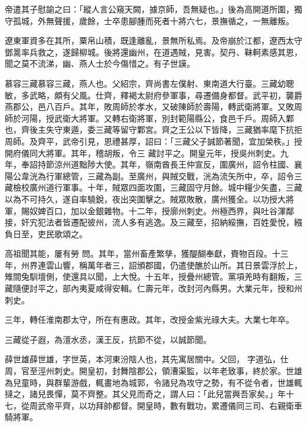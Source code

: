 \begin{pinyinscope}
 帝遣其子慰諭之曰：「縱人言公窺天闕，據京師，吾無疑也。」後為高開道所圍，獨守孤城，外無聲援，歲餘，士卒患腳腫而死者十將六七，景撫循之，一無離叛。



 遼東軍資多在其所，粟帛山積，既逢離亂，景無所私焉。及帝崩於江都，遼西太守鄧暠率兵救之，遂歸柳城。後將還幽州，在道遇賊，見害。契丹、靺軻素感其恩，聞之莫不流涕，幽、燕人士於今傷惜之。有子世謨。



 慕容三藏慕容三藏，燕人也。父紹宗，齊尚書左僕射、東南道大行臺。三藏幼聰敏，多武略，頗有父風。仕齊，釋褐太尉府參軍事，尋遷備身都督。武平初，襲爵燕郡公，邑八百戶。其年，敗周師於孝水，又破陳師於壽陽，轉武衛將軍。又敗周師於河陽，授武衛大將軍。又轉右衛將軍，別封範陽縣公，食邑千戶。周師入鄴也，齊後主失守東遁，委三藏等留守鄴宮。齊之王公以下皆降，三藏猶率麾下抗拒周師。及齊平，武帝引見，恩禮甚厚，詔曰：「三藏父子誠節著聞，宜加榮秩。」授開府儀同大將軍。其年，稽胡叛，令三
 藏討平之。開皇元年，授吳州刺史。九年，奉詔持節涼州道黜陟大使。其年，嶺南酋長王仲宣反，圍廣州，詔令柱國、襄陽公韋洸為行軍總管，三藏為副。至廣州，與賊交戰，洸為流矢所中，卒，詔令三藏檢校廣州道行軍事。十年，賊眾四面攻圍，三藏固守月餘。城中糧少矢盡，三藏以為不可持久，遂自率驍銳，夜出突圍擊之。賊眾敗散，廣州獲全。以功授大將軍，賜奴婢百口，加以金銀雜物。十二年，授廓州刺史。州極西界，與吐谷渾鄰接，奸宄犯法者皆遷配彼州，流人多有逃逸。及三藏至，招納綏撫，百姓愛悅，繦負日至，吏民歌頌之。



 高祖聞其能，屢有勞
 問。其年，當州畜產繁孳，獲醍醐奉獻，賚物百段。十三年，州界連雲山響，稱萬年者三，詔頒郡國，仍遣使醮於山所。其日景雲浮於上，雉間兔馴壇側，使還具以聞，上大悅。十五年，授疊州總管。黨項羌時有翻叛，三藏隨便討平之，部內夷夏咸得安輯。仁壽元年，改封河內縣男。大業元年，授和州刺史。



 三年，轉任淮南郡太守，所在有惠政。其年，改授金紫光祿大夫。大業七年卒。



 三藏從子遐，為澶水丞，漢王反，抗節不從，以誠節聞。



 薛世雄薛世雄，字世英，本河東汾陰人也，其先寓居關中。父回，
 字道弘，仕周，官至涇州刺史。開皇初，封舞陰郡公，領漕渠監，以年老致事，終於家。世雄為兒童時，與群輩游戲，輒畫地為城郭，令諸兒為攻守之勢，有不從令者，世雄輒撻之，諸兒畏憚，莫不齊整。其父見而奇之，謂人曰：「此兒當興吾家矣。」年十七，從周武帝平齊，以功拜帥都督。開皇時，數有戰功，累遷儀同三司、右親衛車騎將軍。




\end{pinyinscope}
